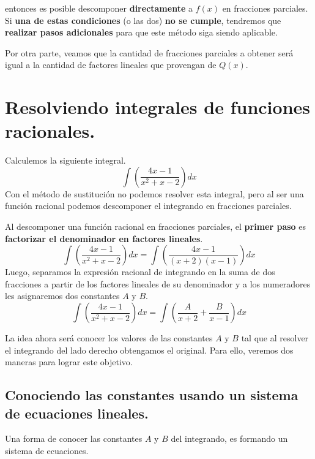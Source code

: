 \documentclass[12pt]{article}
\begin{document}
entonces es posible descomponer \textbf{directamente} a $f(x)$ en fracciones parciales. Si \textbf{una de estas condiciones} (o las dos) \textbf{no se cumple}, tendremos que \textbf{realizar pasos adicionales} para que este método siga siendo aplicable.

Por otra parte, veamos que la cantidad de fracciones parciales a obtener será igual a la cantidad de factores lineales que provengan de $Q(x)$.


\section{Resolviendo integrales de funciones racionales.}

Calculemos la siguiente integral.
\[
  \int \left(\frac{4x - 1}{x^{2} + x - 2}\right) dx
\]
Con el método de sustitución no podemos resolver esta integral, pero al ser una función racional podemos descomponer el integrando en fracciones parciales.

Al descomponer una función racional en fracciones parciales, el \textbf{primer paso} es \textbf{factorizar el denominador en factores lineales}.
\[
  \int \left(\frac{4x - 1}{x^{2} + x - 2}\right) dx = \int \left(\frac{4x - 1}{(x + 2)(x - 1)}\right) dx
\]
Luego, separamos la expresión racional de integrando en la suma de dos fracciones a partir de los factores lineales de su denominador y a los numeradores les asignaremos dos constantes $A$ y $B$.
\[
  \int \left(\frac{4x - 1}{x^{2} + x - 2}\right) dx = \int \left(\frac{A}{x + 2} + \frac{B}{x - 1}\right) dx
\]

La idea ahora será conocer los valores de las constantes $A$ y $B$ tal que al resolver el integrando del lado derecho obtengamos el original. Para ello, veremos dos maneras para lograr este objetivo.

\subsection{Conociendo las constantes usando un sistema de ecuaciones lineales.}

Una forma de conocer las constantes $A$ y $B$ del integrando, es formando un sistema de ecuaciones.
\end{document}
